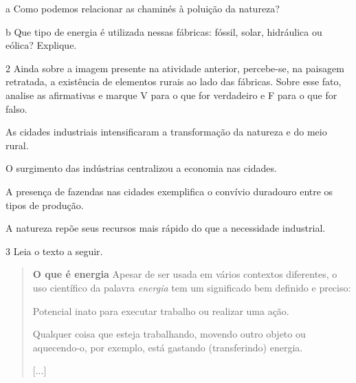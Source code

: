 \num{a} Como podemos relacionar as chaminés à poluição da natureza?



\num{b} Que tipo de energia é utilizada nessas fábricas: fóssil, solar, hidráulica ou eólica? Explique.



\num{2} Ainda sobre a imagem presente na atividade anterior, percebe-se, na paisagem retratada, a existência de elementos rurais ao lado das fábricas.
Sobre esse fato, analise as afirmativas e marque V para o que for verdadeiro e F para o que for falso.

\begin{boxlist}
\item As cidades industriais intensificaram a transformação da natureza e
do meio rural. 

\item O surgimento das indústrias centralizou a economia nas cidades. 

\item A presença de fazendas nas cidades exemplifica o convívio duradouro
entre os tipos de produção. 

\item A natureza repõe seus recursos mais rápido do que a necessidade
industrial. 
\end{boxlist}


\num{3} Leia o texto a seguir.

\begin{quote}
\textbf{O que é energia}
Apesar de ser usada em vários contextos diferentes, o uso
científico da palavra \emph{energia} tem um significado bem definido e preciso:

Potencial inato para executar trabalho ou realizar uma ação.

Qualquer
coisa que esteja trabalhando, movendo outro objeto ou aquecendo-o, por
exemplo, está gastando (transferindo) energia.

{[}...{]}

\end{quote}

